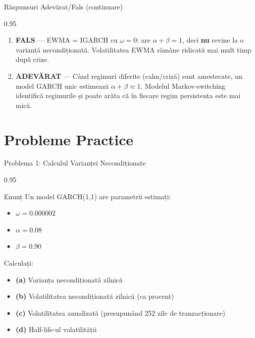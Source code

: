\documentclass[9pt, aspectratio=169, t]{beamer}
\begin{document}
\begin{frame}{Răspunsuri Adevărat/Fals (continuare)}
    \begin{cminipage}{0.95\textwidth}
    \begin{enumerate}\setlength{\itemsep}{0pt}
    \setcounter{enumi}{6}
        \item \textbf{FALS} --- EWMA = IGARCH cu $\omega = 0$: are $\alpha + \beta = 1$, deci \textbf{nu} revine la o varianță necondiționată. Volatilitatea EWMA rămâne ridicată mai mult timp după crize.

        \vspace{0.2cm}

        \item \textbf{ADEVĂRAT} --- Când regimuri diferite (calm/criză) sunt amestecate, un model GARCH unic estimează $\alpha + \beta \approx 1$. Modelul Markov-switching identifică regimurile și poate arăta că în fiecare regim persistența este mai mică.
    \end{enumerate}
    \end{cminipage}
\end{frame}

\section{Probleme Practice}

\begin{frame}{Problema 1: Calculul Varianței Necondiționate}
    \begin{cminipage}{0.95\textwidth}
    \begin{block}{Enunț}
        Un model GARCH(1,1) are parametrii estimați:
        \begin{itemize}\setlength{\itemsep}{0pt}
            \item $\omega = 0.000002$
            \item $\alpha = 0.08$
            \item $\beta = 0.90$
        \end{itemize}

        \vspace{0.3cm}
        Calculați:
        \begin{itemize}\setlength{\itemsep}{0pt}
            \item \textbf{(a)} Varianța necondiționată zilnică
            \item \textbf{(b)} Volatilitatea necondiționată zilnică (ca procent)
            \item \textbf{(c)} Volatilitatea anualizată (presupunând 252 zile de tranzacționare)
            \item \textbf{(d)} Half-life-ul volatilității
        \end{itemize}
    \end{block}
    \end{cminipage}
\end{frame}
\end{document}
